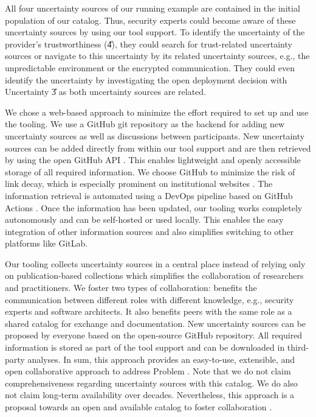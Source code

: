All four uncertainty sources of our running example are contained in the initial population of our catalog.
Thus, security experts could become aware of these uncertainty sources by using our tool support.
To identify the uncertainty of the provider's trustworthiness (\U{4}), they could search for trust-related uncertainty sources or navigate to this uncertainty by its related uncertainty sources, e.g., the unpredictable environment or the encrypted communication.
They could even identify the uncertainty by investigating the open deployment decision with Uncertainty \U{3} as both uncertainty sources are related.

We chose a web-based approach to minimize the effort required to set up and use the tooling.
We use a GitHub \cite{GitHub2024} git repository as the backend for adding new uncertainty sources as well as discussions between participants.
New uncertainty sources can be added directly from within our tool support and are then retrieved by using the open GitHub API \cite{GitHub2024}.
This enables lightweight and openly accessible storage of all required information.
We choose GitHub to minimize the risk of link decay, which is especially prominent on institutional websites \cite{goh_link_2007}.
The information retrieval is automated using a DevOps pipeline based on GitHub Actions \cite{GitHub2024}.
Once the information has been updated, our tooling works completely autonomously and can be self-hosted or used locally.
This enables the easy integration of other information sources and also simplifies switching to other platforms like GitLab.

Our tooling \arcen collects uncertainty sources in a central place instead of relying only on publication-based collections which simplifies the collaboration of researchers and practitioners.
We foster two types of collaboration: \arcen benefits the communication between different roles with different knowledge, e.g., security experts and software architects. 
It also benefits peers with the same role as a shared catalog for exchange and documentation.
New uncertainty sources can be proposed by everyone based on the open-source GitHub repository.
All required information is stored as part of the tool support and can be downloaded in third-party analyses.
In sum, this approach provides an easy-to-use, extensible, and open collaborative approach to address Problem .
Note that we do not claim comprehensiveness regarding uncertainty sources with this catalog.
We do also not claim long-term availability over decades.
Nevertheless, this approach is a proposal towards an open and available catalog to foster collaboration \cite{sterz_intelligente_2022}.





